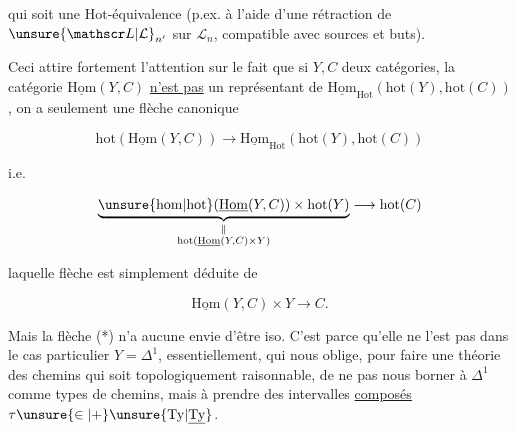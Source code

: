 
qui soit une $\mathrm{Hot}$-équivalence (p.ex. à l'aide d'une rétraction de $\unsure{\mathscr L|\mathcal L}_{n'}$ sur $\mathscr L_n$,  compatible avec sources et buts).

Ceci attire fortement l'attention sur le fait que si $Y,C$  deux catégories, la catégorie $\underline{\mathrm{Hom}}(Y,C)$ \uline{n'est pas} un représentant de  $\underline{\mathrm{Hom}}_{\mathrm{Hot}}(\mathrm{hot}(Y),\mathrm{hot}(C))$, on a seulement une  flèche canonique

\[
\mathrm{hot}(\underline{\mathrm{Hom}}(Y,C))\longrightarrow \underline{\mathrm{Hom}}_{\mathrm{Hot}}(\mathrm{hot}(Y),\mathrm{hot}(C))
\tag*{(*)}
\]

i.e.

\[
\underbrace{\unsure{\mathrm{hom}|\mathrm{hot}}(\underline{\mathrm{Hom}}(Y,C))\times\mathrm{hot}(Y)}_{\substack{\Vert\\ \mathrm{hot}(\underline{\mathrm{Hom}}(Y,C)\times Y)}}\longrightarrow\mathrm{hot}(C)
\]

laquelle flèche est simplement déduite de

\[
\underline{\mathrm{Hom}}(Y,C)\times Y\longrightarrow C.
\]

Mais la flèche (*) n'a aucune envie d'être iso. C'est parce qu'elle ne l'est  pas dans le cas particulier $Y=\Delta^1$, essentiellement, qui nous oblige, pour faire une théorie des chemins  qui soit topologiquement raisonnable, de ne pas nous borner à $\Delta^1$ comme types de chemins, mais à prendre des intervalles \uline{composés} $\tau\unsure{\in|+}\unsure{\mathrm{Ty}|\underline{\mathrm{Ty}}}$.

